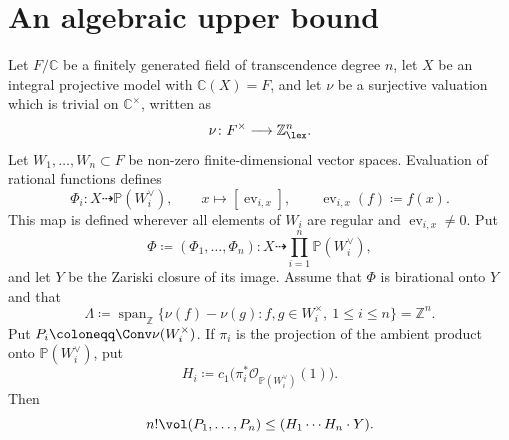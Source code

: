 \documentclass[11pt,a4paper]{amsart}
\begin{document}
\section{An algebraic upper bound}

\begin{lemma}\label{lem:finite-level}
Let $F/\mathbb C$ be a finitely generated field of transcendence degree $n$,
let $X$ be an integral projective model with $\mathbb C(X)=F$, and let $\nu$
be a surjective valuation which is trivial on $\mathbb C^\times$, written as
\[
 \nu\colon F^\times\longrightarrow\mathbb Z^n_{\lex}.
\]
Let $W_1,\ldots,W_n\subset F$ be non-zero finite-dimensional vector spaces.
Evaluation of rational functions defines
\[
 \Phi_i\colon X\dashrightarrow\mathbb P(W_i^\vee),\qquad
 x\longmapsto[\operatorname{ev}_{i,x}],\qquad
 \operatorname{ev}_{i,x}(f)\coloneqq f(x).
\]
This map is defined wherever all elements of $W_i$ are regular and
$\operatorname{ev}_{i,x}\neq0$.  Put
\[
 \Phi\coloneqq (\Phi_1,\ldots,\Phi_n)\colon
 X\dashrightarrow\prod_{i=1}^n\mathbb P(W_i^\vee),
\]
and let $Y$ be the Zariski closure of its image.
Assume that $\Phi$ is birational onto $Y$ and that
\[
 \Lambda\coloneqq \operatorname{span}_{\mathbb Z}
 \{\nu(f)-\nu(g):f,g\in W_i^\times,\ 1\leq i\leq n\}=\mathbb Z^n.
\]
Put $P_i\coloneqq \Conv\nu(W_i^\times)$.  If $\pi_i$ is the projection of the
ambient product onto $\mathbb P(W_i^\vee)$, put
\[
 H_i\coloneqq c_1\bigl(\pi_i^*\mathcal O_{\mathbb P(W_i^\vee)}(1)\bigr).
\]
 Then
\begin{equation}\label{eq:finite-level}
 n!\vol(P_1,\ldots,P_n)\leq(H_1\cdots H_n\cdot Y).
\end{equation}
\end{lemma}
\end{document}
